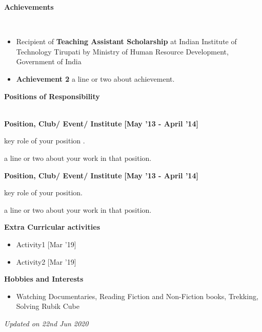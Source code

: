 \documentclass[a4paper,10pt]{article}
\begin{document}
\colorbox{titleColor}{\parbox{6.7in}{\textbf{Achievements}}}\\[0.08in]
\begin{itemize}

\setlength{\itemsep}{1pt}
\item Recipient of \textbf{Teaching Assistant Scholarship} at Indian Institute of Technology Tirupati by Ministry of Human
Resource Development, Government of India
\item \textbf{Achievement 2} a line or two about achievement.
\end{itemize}

\colorbox{titleColor}{\parbox{6.7in}{\textbf{Positions of Responsibility}}}\\

\textbf{Position, Club/ Event/ Institute}  \hfill {\small{{\textbf{[May '13 - April '14]}}}\/}                        
\begin{itemize*}
\item key role of your position .
\item a line or two about your work in that position.
\end{itemize*}

\textbf{Position, Club/ Event/ Institute}  \hfill {\small{{\textbf{[May '13 - April '14]}}}\/}                        
\begin{itemize*}
\item key role of your position.
\item a line or two about your work in that position.
\end{itemize*}

\colorbox{titleColor}{\parbox{6.7in}{\textbf{Extra Curricular activities}}}

\begin{itemize}
  \setlength{\itemsep}{1pt}
  \item Activity1 \hfill {\small{{[Mar '19]}}\/} 
  \item Activity2 \hfill {\small{{[Mar '19]}}\/} 
\end{itemize}

\colorbox{titleColor}{\parbox{6.7in}{\textbf{Hobbies and Interests}}}

\begin{itemize}
  \setlength{\itemsep}{1pt}
  \item Watching Documentaries, Reading Fiction and Non-Fiction books, Trekking, Solving Rubik Cube
\end{itemize}

\textit{Updated on 22nd Jun 2020}
\end{document}
